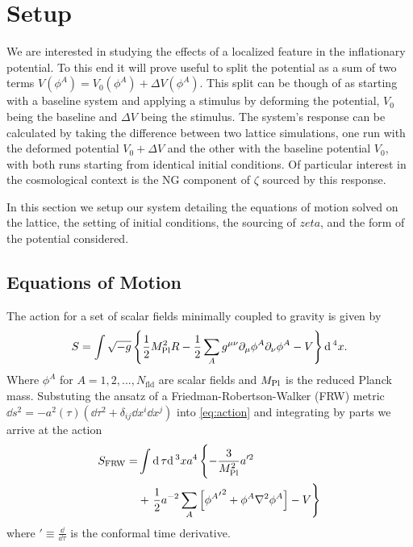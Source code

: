 
\section{Setup} \label{sec:setup}
We are interested in studying the effects of a localized feature in the inflationary potential.
To this end it will prove useful to split the potential as a sum of two terms $V(\phi^A) = V_0(\phi^A) + \Delta V(\phi^A)$.
This split can be though of as starting with a baseline system and applying a stimulus by deforming the potential, $V_0$ being the baseline and $\Delta V$ being the stimulus.
The system's response can be calculated by taking the difference between two lattice simulations, one run with the deformed potential $V_0+\Delta V$ and the other with the baseline potential $V_0$, with both runs starting from identical initial conditions.
Of particular interest in the cosmological context is the NG component of $\zeta$ sourced by this response.

In this section we setup our system detailing the equations of motion solved on the lattice, the setting of initial conditions, the sourcing of $zeta$, and the form of the potential considered.

\subsection{Equations of Motion}

The action for a set of scalar fields minimally coupled to gravity is given by
\begin{equation} \label{eq:action}
  S = \int \sqrt{-g}\left\{\frac{1}{2}M_{\mathrm{Pl}}^2R - \frac{1}{2}\sum_Ag^{\mu\nu}\partial_\mu\phi^A\partial_\nu\phi^A - V \right\}\mathrm{d}\,^4x.
\end{equation}
Where $\phi^A$ for $A=1,2,...,N_\mathrm{fld}$ are scalar fields and $M_{\mathrm{Pl}}$ is the reduced Planck mass. 
Substuting the ansatz of a Friedman-Robertson-Walker (FRW) metric $\dd s^2 = -a^2(\tau)\left( \dd\tau^2 + \delta_{ij}\dd x^i\dd x^j \right)$ into \eqref{eq:action} and integrating by parts we arrive at the action
\begin{align} \label{eq:actionFRW}
  \begin{split}
    S_{\mathrm{FRW}} = &\int \dd\tau\dd^3xa^4\left\{
    - \frac{3}{\mpl^2}a'^2 \vphantom{\sum_A}\right. \\
    & + \left.\frac{1}{2}a^{-2}\sum_A\left[{{\phi^A}'}^2
      + \phi^A\nabla^2\phi^A\right] %
      - V \right\}
    \end{split}
\end{align}
where ${}' \equiv \frac{\dd}{\dd\tau}$ is the conformal time derivative.

